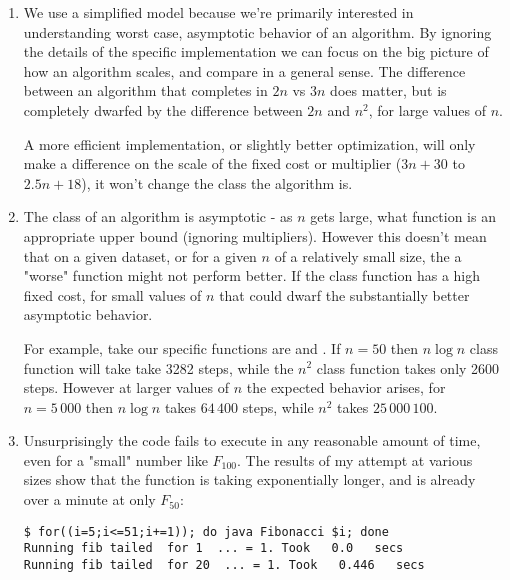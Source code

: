 \documentclass[12pt]{chmullighw}
\begin{document}
\begin{enumerate}

\item We use a simplified model because we're primarily interested in
understanding worst case, asymptotic behavior of an algorithm. By ignoring the
details of the specific implementation we can focus on the big picture of how an
algorithm scales, and compare in a general sense. The difference between an algorithm
that completes in $2n$ vs $3n$ does matter, but is completely dwarfed by the
difference between $2n$ and $n^2$, for large values of $n$. 

A more efficient implementation, or slightly better optimization, will only make
a difference on the scale of the fixed cost or multiplier ($3n+30$ to $2.5n+18$),
it won't change the class the algorithm is.


\item The class of an algorithm is asymptotic - as $n$ gets large, what function
is an appropriate upper bound (ignoring multipliers). However this doesn't mean
that on a given dataset, or for a given $n$ of a relatively small size, the
a "worse" function might not perform better. If the  class function
has a high fixed cost, for small values of $n$ that could dwarf the substantially
better asymptotic behavior. 

For example, take our specific functions are  and
. If $n = 50$ then $n \log n$ class function will take take
3282 steps, while the $n^2$ class function takes only 2600 steps. However at
larger values of $n$ the expected behavior arises, for $n = 5\,000$ then $n \log n$
takes $64\,400$ steps, while $n^2$ takes $25\,000\,100$.


\item


Unsurprisingly the code fails to execute in any reasonable amount of time, even
for a "small" number like $F_{100}$. The results of my attempt at various sizes
show that the function is taking exponentially longer, and is already over a minute
at only $F_{50}$:

\begin{verbatim}
$ for((i=5;i<=51;i+=1)); do java Fibonacci $i; done
Running fib tailed  for 1  ... = 1. Took   0.0   secs
Running fib tailed  for 20  ... = 1. Took   0.446   secs

\end{verbatim}


\end{enumerate}
\end{document}
